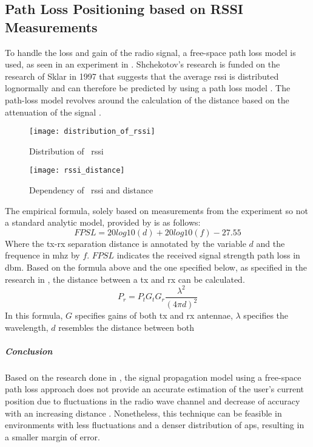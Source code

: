 \subsection{Path Loss Positioning based on RSSI Measurements}
To handle the loss and gain of the radio signal, a free-space path loss model is used, as seen in an experiment in \cite[p.178]{Shchekotov}. Shchekotov's research is funded on the research of Sklar in 1997 that suggests that the average \acrshort{rssi} is distributed lognormally and can therefore be predicted by using a path loss model \cite[p.16]{S2016}. The path-loss model revolves around the calculation of the distance based on the attenuation of the signal \cite{Mautz}.
\begin{figure}[h!]
\centering
\texttt{[image: distribution\_of\_rssi]}
\caption{Distribution of ~\acrlong{rssi} ~\cite[p.16]{S2016}}
\label{fig:distribution_rssi}
\end{figure}
\begin{figure}[h!]
\centering
\texttt{[image: rssi\_distance]}
\caption{Dependency of ~\acrlong{rssi} and distance ~\cite[p.61]{Mautz}}
\label{fig:rssi_distance}
\end{figure}
The empirical formula, solely based on measurements from the experiment so not a standard analytic model, provided by \cite{S2016} is as follows:
\[
FPSL = 20log10(d) + 20log10(f) - 27.55
\]
Where the \acrlong{tx}-\acrlong{rx} separation distance is annotated by the variable $d$ and the frequence in \acrfull{mhz} by $f$. $FPSL$ indicates the received signal strength path loss in \acrfull{dbm}. Based on the formula above and the one specified below, as specified in the research in \cite[p.13]{S2016}, the distance between a \acrlong{tx} and \acrlong{rx} can be calculated.
\[
P_r = P_t G_t G_r \frac{\lambda^2}{(4 \pi d)^2}
\]
In this formula, $G$ specifies gains of both \acrshort{tx} and \acrshort{rx} antennae, $\lambda$ specifies the wavelength, $d$ resembles the distance between both \
\subparagraph{Conclusion}
Based on the research done in \cite{Shchekotov}, the signal propagation model using a free-space path loss approach does not provide an accurate estimation of the user's current position due to fluctuations in the radio wave channel and decrease of accuracy with an increasing distance \cite[p~61]{Mautz} \cite[p~2]{Loy2018}. Nonetheless, this technique can be feasible in environments with less fluctuations and a denser distribution of \acrshort{ap}s, resulting in a smaller margin of error. 
